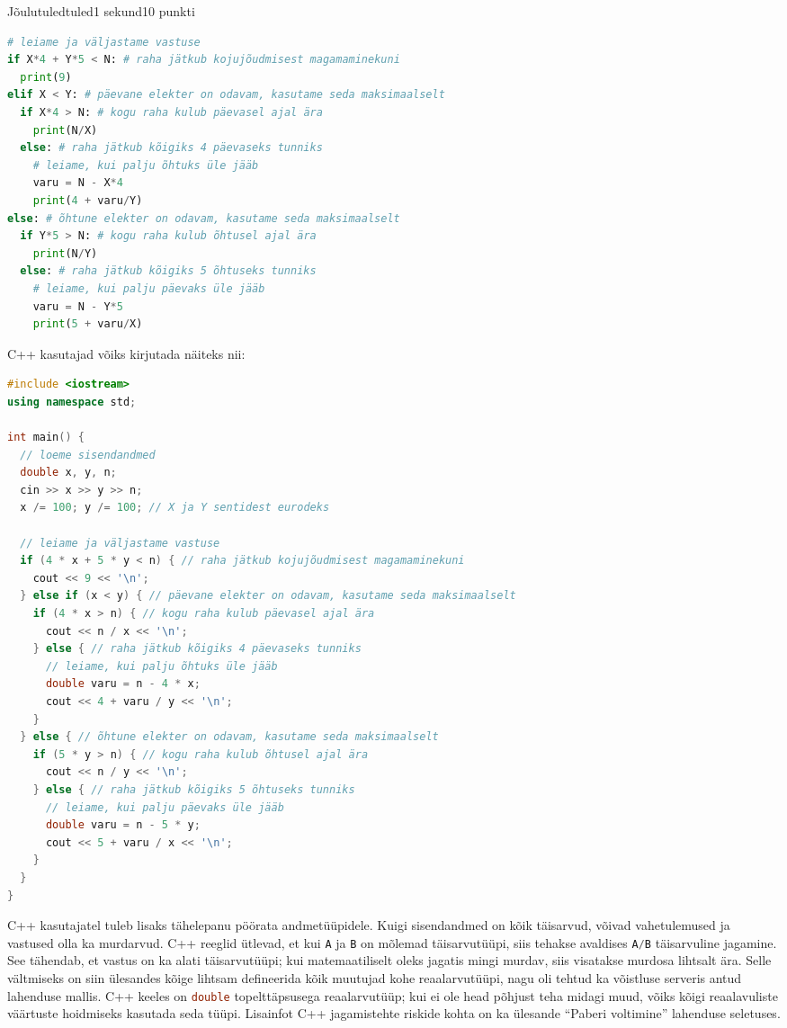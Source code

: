 \begin{yl}{1}{Jõulutuled}{tuled}{1 sekund}{10 punkti}
\begin{lstlisting}[language=Python]
# leiame ja väljastame vastuse
if X*4 + Y*5 < N: # raha jätkub kojujõudmisest magamaminekuni
  print(9)
elif X < Y: # päevane elekter on odavam, kasutame seda maksimaalselt
  if X*4 > N: # kogu raha kulub päevasel ajal ära
    print(N/X)
  else: # raha jätkub kõigiks 4 päevaseks tunniks
    # leiame, kui palju õhtuks üle jääb
    varu = N - X*4
    print(4 + varu/Y)
else: # õhtune elekter on odavam, kasutame seda maksimaalselt
  if Y*5 > N: # kogu raha kulub õhtusel ajal ära
    print(N/Y)
  else: # raha jätkub kõigiks 5 õhtuseks tunniks
    # leiame, kui palju päevaks üle jääb
    varu = N - Y*5
    print(5 + varu/X)
\end{lstlisting}

  \clearpage
  C++ kasutajad võiks kirjutada näiteks nii:
\begin{lstlisting}[language=C++]
#include <iostream>
using namespace std;

int main() {
  // loeme sisendandmed
  double x, y, n;
  cin >> x >> y >> n;
  x /= 100; y /= 100; // X ja Y sentidest eurodeks

  // leiame ja väljastame vastuse
  if (4 * x + 5 * y < n) { // raha jätkub kojujõudmisest magamaminekuni
    cout << 9 << '\n';
  } else if (x < y) { // päevane elekter on odavam, kasutame seda maksimaalselt
    if (4 * x > n) { // kogu raha kulub päevasel ajal ära
      cout << n / x << '\n';
    } else { // raha jätkub kõigiks 4 päevaseks tunniks
      // leiame, kui palju õhtuks üle jääb
      double varu = n - 4 * x;
      cout << 4 + varu / y << '\n';
    }
  } else { // õhtune elekter on odavam, kasutame seda maksimaalselt
    if (5 * y > n) { // kogu raha kulub õhtusel ajal ära
      cout << n / y << '\n';
    } else { // raha jätkub kõigiks 5 õhtuseks tunniks
      // leiame, kui palju päevaks üle jääb
      double varu = n - 5 * y;
      cout << 5 + varu / x << '\n';
    }
  }
}
\end{lstlisting}

  C++ kasutajatel tuleb lisaks tähelepanu pöörata andmetüüpidele. Kuigi sisendandmed on kõik täisarvud, võivad vahetulemused ja vastused olla ka murdarvud. C++ reeglid ütlevad, et kui \lstinline[language=C++]{A} ja \lstinline[language=C++]{B} on mõlemad täisarvutüüpi, siis tehakse avaldises \lstinline[language=C++]{A/B} täisarvuline jagamine. See tähendab, et vastus on ka alati täisarvutüüpi; kui matemaatiliselt oleks jagatis mingi murdav, siis visatakse murdosa lihtsalt ära. Selle vältmiseks on siin ülesandes kõige lihtsam defineerida kõik muutujad kohe reaalarvutüüpi, nagu oli tehtud ka võistluse serveris antud lahenduse mallis. C++ keeles on \lstinline[language=C++]{double} topelttäpsusega reaalarvutüüp; kui ei ole head põhjust teha midagi muud, võiks kõigi reaalavuliste väärtuste hoidmiseks kasutada seda tüüpi. Lisainfot C++ jagamistehte riskide kohta on ka ülesande ``Paberi voltimine'' lahenduse seletuses.
\end{yl}
